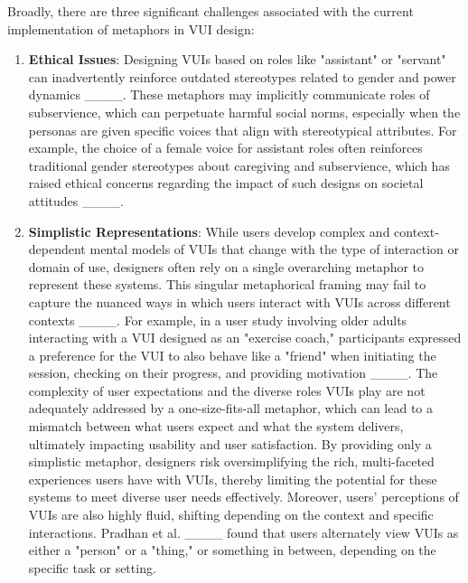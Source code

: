 Broadly, there are three significant challenges associated with the current implementation of metaphors in VUI design:
\begin{enumerate}

\item \textbf{Ethical Issues}: Designing VUIs based on roles like "assistant" or "servant" can inadvertently reinforce outdated stereotypes related to gender and power dynamics ____. These metaphors may implicitly communicate roles of subservience, which can perpetuate harmful social norms, especially when the personas are given specific voices that align with stereotypical attributes. For example, the choice of a female voice for assistant roles often reinforces traditional gender stereotypes about caregiving and subservience, which has raised ethical concerns regarding the impact of such designs on societal attitudes ____.

\item \textbf{Simplistic Representations}: While users develop complex and context-dependent mental models of VUIs that change with the type of interaction or domain of use, designers often rely on a single overarching metaphor to represent these systems. This singular metaphorical framing may fail to capture the nuanced ways in which users interact with VUIs across different contexts ____. For example, in a user study involving older adults interacting with a VUI designed as an "exercise coach," participants expressed a preference for the VUI to also behave like a "friend" when initiating the session, checking on their progress, and providing motivation ____. The complexity of user expectations and the diverse roles VUIs play are not adequately addressed by a one-size-fits-all metaphor, which can lead to a mismatch between what users expect and what the system delivers, ultimately impacting usability and user satisfaction. By providing only a simplistic metaphor, designers risk oversimplifying the rich, multi-faceted experiences users have with VUIs, thereby limiting the potential for these systems to meet diverse user needs effectively.  Moreover, users' perceptions of VUIs are also highly fluid, shifting depending on the context and specific interactions. Pradhan et al. ____ found that users alternately view VUIs as either a "person" or a "thing," or something in between, depending on the specific task or setting. 


\end{enumerate}
